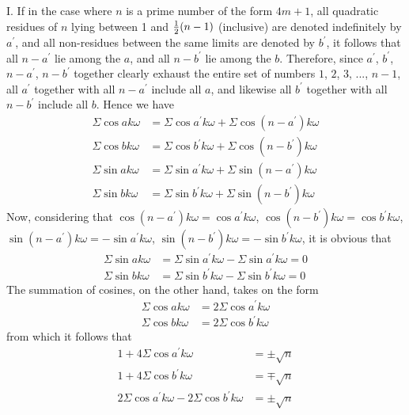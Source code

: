 \documentclass[twoside,12pt]{memoir}
\let\oldfrac\frac
\def\frac#1#2{\mathchoice{\tfrac{#1}{#2}}{\oldfrac{#1}{#2}}{\genfrac{}{}{}{2}{#1}{#2\mathstrut}}{\genfrac{}{}{}{3}{#1}{#2\mathstrut}}}
\begin{document}
I. If in the case where \(n\) is a prime number of the form \(4m+1\), all quadratic residues of \(n\) lying between 1 and \(\frac{1}{2}(n-1)\) (inclusive) are denoted indefinitely by \(a^{\prime}\), and all non-residues between the same limits are denoted by \(b^{\prime}\), it follows that all \(n-a^{\prime}\) lie among the \(a\), and all \(n-b^{\prime}\) lie among the \(b\). Therefore, since \(a^{\prime}\), \(b^{\prime}\), \(n-a^{\prime}\), \(n-b^{\prime}\) together clearly exhaust the entire set of numbers \(1\), \(2\), \(3\), ..., \(n-1\), all \(a^{\prime}\) together with all \(n-a^{\prime}\) include all \(a\), and likewise all \(b^{\prime}\) together with all \(n-b^{\prime}\) include all \(b\). Hence we have\pagebreak%
\[\begin{aligned}
\Sigma \cos ak\omega &= \Sigma \cos a^{\prime}k\omega + \Sigma \cos (n-a^{\prime})k\omega \\
\Sigma \cos bk\omega &= \Sigma \cos b^{\prime}k\omega + \Sigma \cos (n-b^{\prime})k\omega \\
\Sigma \sin ak\omega &= \Sigma \sin a^{\prime}k\omega + \Sigma \sin (n-a^{\prime})k\omega \\
\Sigma \sin bk\omega &= \Sigma \sin b^{\prime}k\omega + \Sigma \sin (n-b^{\prime})k\omega
\end{aligned}\]
Now, considering that \(\cos (n-a^{\prime})k\omega = \cos a^{\prime}k\omega\), \(\cos (n-b^{\prime})k\omega = \cos b^{\prime}k\omega\), \(\sin (n-a^{\prime})k\omega = -\sin a^{\prime}k\omega\), \(\sin (n-b^{\prime})k\omega = -\sin b^{\prime}k\omega\), it is obvious that
\[\begin{aligned}
\Sigma \sin ak\omega &= \Sigma \sin a^{\prime}k\omega - \Sigma \sin a^{\prime}k\omega = 0 \\
\Sigma \sin bk\omega &= \Sigma \sin b^{\prime}k\omega - \Sigma \sin b^{\prime}k\omega = 0
\end{aligned}\]
The summation of cosines, on the other hand, takes on the form
\[\begin{aligned}
\Sigma \cos ak\omega &= 2 \Sigma \cos a^{\prime}k\omega \\
\Sigma \cos bk\omega &= 2 \Sigma \cos b^{\prime}k\omega
\end{aligned}\]
from which it follows that
\[\begin{aligned}
1 + 4\Sigma \cos a^{\prime}k\omega &= \pm \sqrt{n} \\
1 + 4\Sigma \cos b^{\prime}k\omega &= \mp \sqrt{n} \\
2 \Sigma \cos a^{\prime}k\omega - 2 \Sigma \cos b^{\prime}k\omega &= \pm \sqrt{n}
\end{aligned}\]
\end{document}
